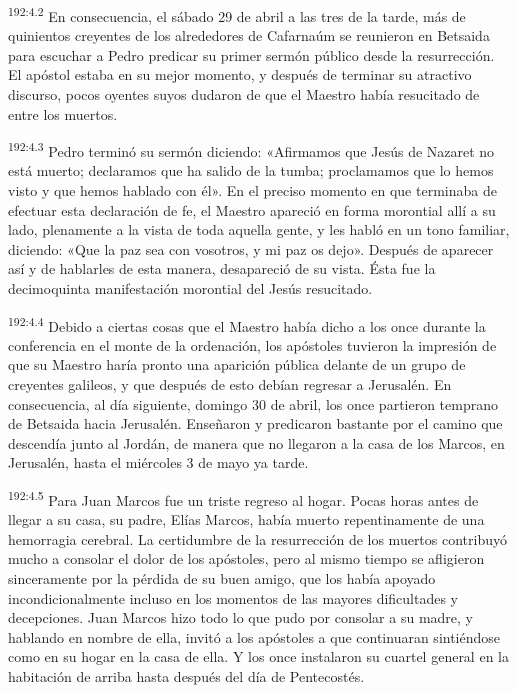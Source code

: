 \par 
\textsuperscript{192:4.2} En consecuencia, el sábado 29 de abril a las tres de la tarde, más de quinientos creyentes de los alrededores de Cafarnaúm se reunieron en Betsaida para escuchar a Pedro predicar su primer sermón público desde la resurrección. El apóstol estaba en su mejor momento, y después de terminar su atractivo discurso, pocos oyentes suyos dudaron de que el Maestro había resucitado de entre los muertos.

\par 
\textsuperscript{192:4.3} Pedro terminó su sermón diciendo: «Afirmamos que Jesús de Nazaret no está muerto; declaramos que ha salido de la tumba; proclamamos que lo hemos visto y que hemos hablado con él». En el preciso momento en que terminaba de efectuar esta declaración de fe, el Maestro apareció en forma morontial allí a su lado, plenamente a la vista de toda aquella gente, y les habló en un tono familiar, diciendo: «Que la paz sea con vosotros, y mi paz os dejo». Después de aparecer así y de hablarles de esta manera, desapareció de su vista. Ésta fue la decimoquinta manifestación morontial del Jesús resucitado.

\par 
\textsuperscript{192:4.4} Debido a ciertas cosas que el Maestro había dicho a los once durante la conferencia en el monte de la ordenación, los apóstoles tuvieron la impresión de que su Maestro haría pronto una aparición pública delante de un grupo de creyentes galileos, y que después de esto debían regresar a Jerusalén. En consecuencia, al día siguiente, domingo 30 de abril, los once partieron temprano de Betsaida hacia Jerusalén. Enseñaron y predicaron bastante por el camino que descendía junto al Jordán, de manera que no llegaron a la casa de los Marcos, en Jerusalén, hasta el miércoles 3 de mayo ya tarde.

\par 
\textsuperscript{192:4.5} Para Juan Marcos fue un triste regreso al hogar. Pocas horas antes de llegar a su casa, su padre, Elías Marcos, había muerto repentinamente de una hemorragia cerebral. La certidumbre de la resurrección de los muertos contribuyó mucho a consolar el dolor de los apóstoles, pero al mismo tiempo se afligieron sinceramente por la pérdida de su buen amigo, que los había apoyado incondicionalmente incluso en los momentos de las mayores dificultades y decepciones. Juan Marcos hizo todo lo que pudo por consolar a su madre, y hablando en nombre de ella, invitó a los apóstoles a que continuaran sintiéndose como en su hogar en la casa de ella. Y los once instalaron su cuartel general en la habitación de arriba hasta después del día de Pentecostés.

